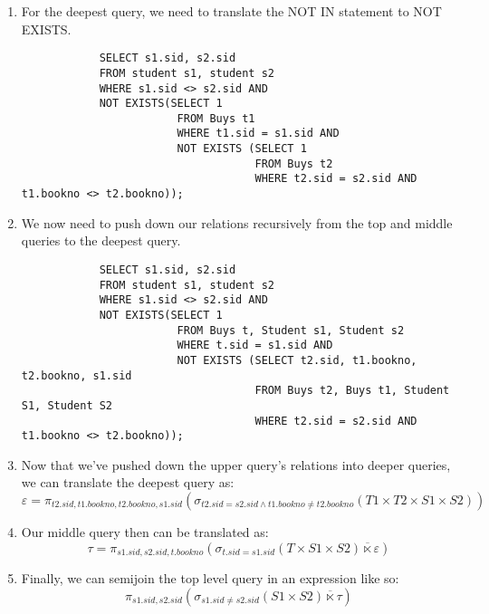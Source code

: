 \documentclass{article}
\begin{document}
\begin{enumerate}
\begin{enumerate}
\begin{enumerate}
            \item For the deepest query, we need to translate the NOT IN statement to NOT EXISTS.
            \begin{lstlisting}
            SELECT s1.sid, s2.sid
            FROM student s1, student s2
            WHERE s1.sid <> s2.sid AND
            NOT EXISTS(SELECT 1
                        FROM Buys t1
                        WHERE t1.sid = s1.sid AND
                        NOT EXISTS (SELECT 1
                                    FROM Buys t2
                                    WHERE t2.sid = s2.sid AND t1.bookno <> t2.bookno));
            \end{lstlisting}

            \item We now need to push down our relations recursively from the top and middle queries to the deepest query.
            \begin{lstlisting}
            SELECT s1.sid, s2.sid
            FROM student s1, student s2
            WHERE s1.sid <> s2.sid AND
            NOT EXISTS(SELECT 1
                        FROM Buys t, Student s1, Student s2
                        WHERE t.sid = s1.sid AND
                        NOT EXISTS (SELECT t2.sid, t1.bookno, t2.bookno, s1.sid
                                    FROM Buys t2, Buys t1, Student S1, Student S2
                                    WHERE t2.sid = s2.sid AND t1.bookno <> t2.bookno));
            \end{lstlisting}

            \item Now that we've pushed down the upper query's relations into deeper queries, we can translate the deepest
            query as:
            \begin{displaymath}
                \varepsilon = \pi_{t2.sid, t1.bookno, t2.bookno, s1.sid}(\sigma_{t2.sid=s2.sid \wedge t1.bookno \ne t2.bookno}(T1 \times T2 \times S1 \times S2))
            \end{displaymath}

            \item Our middle query then can be translated as:
            \begin{displaymath}
                \tau = \pi_{s1.sid, s2.sid, t.bookno}(\sigma_{t.sid=s1.sid}(T \times S1 \times S2) \overline{\ltimes} \varepsilon)
            \end{displaymath}

            \item Finally, we can semijoin the top level query in an expression like so:
            \begin{displaymath}
                \pi_{s1.sid, s2.sid}(\sigma_{s1.sid \ne s2.sid}(S1 \times S2) \overline{\ltimes} \tau)
            \end{displaymath}


\end{enumerate}
\end{enumerate}
\end{enumerate}
\end{document}
